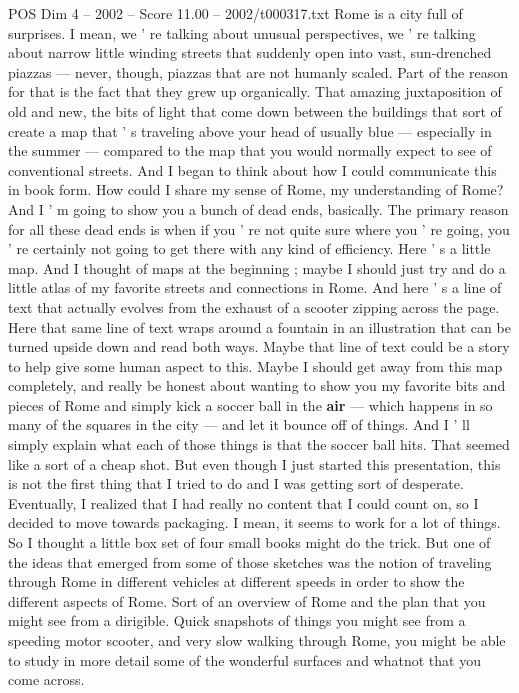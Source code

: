\begin{textsample}{POS Dim 4 – 2002 – Score 11.00 – 2002/t000317.txt}
Rome is a city full of surprises.
I mean, we ' re talking about unusual perspectives, we ' re talking about narrow little winding streets that suddenly open into vast, sun-drenched piazzas — never, though, piazzas that are not humanly scaled.
Part of the reason for that is the fact that they grew up organically.
That amazing juxtaposition of old and new, the bits of light that come down between the buildings that sort of create a map that ' s traveling above your head of usually blue — especially in the summer — compared to the map that you would normally expect to see of conventional streets.
And I began to think about how I could communicate this in book form.
How could I share my sense of Rome, my understanding of Rome?
And I ' m going to show you a bunch of dead ends, basically.
The primary reason for all these dead ends is when if you ' re not quite sure where you ' re going, you ' re certainly not going to get there with any kind of efficiency.
Here ' s a little map.
And I thought of maps at the beginning ; maybe I should just try and do a little atlas of my favorite streets and connections in Rome.
And here ' s a line of text that actually evolves from the exhaust of a scooter zipping across the page.
Here that same line of text wraps around a fountain in an illustration that can be turned upside down and read both ways.
Maybe that line of text could be a story to help give some human aspect to this.
Maybe I should get away from this map completely, and really be honest about wanting to show you my favorite bits and pieces of Rome and simply kick a soccer ball in the \textbf{air} — which happens in so many of the squares in the city — and let it bounce off of things.
And I ' ll simply explain what each of those things is that the soccer ball hits.
That seemed like a sort of a cheap shot.
But even though I just started this presentation, this is not the first thing that I tried to do and I was getting sort of desperate.
Eventually, I realized that I had really no content that I could count on, so I decided to move towards packaging.
I mean, it seems to work for a lot of things.
So I thought a little box set of four small books might do the trick.
But one of the ideas that emerged from some of those sketches was the notion of traveling through Rome in different vehicles at different speeds in order to show the different aspects of Rome.
Sort of an overview of Rome and the plan that you might see from a dirigible.
Quick snapshots of things you might see from a speeding motor scooter, and very slow walking through Rome, you might be able to study in more detail some of the wonderful surfaces and whatnot that you come across.

\end{textsample}
